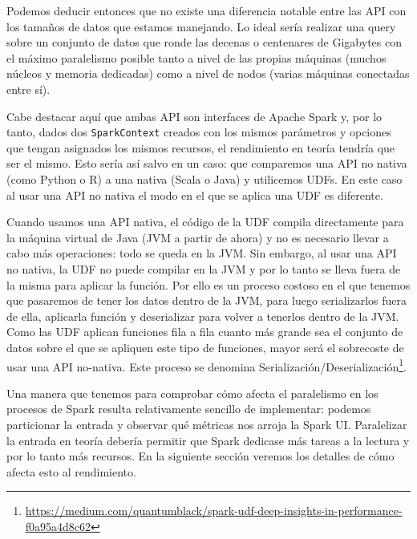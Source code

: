 \documentclass[12pt,twoside,titlepage]{report}
\begin{document}
Podemos deducir entonces que no existe una diferencia notable entre las API con los tamaños de datos que estamos manejando. Lo ideal sería realizar una query sobre un conjunto de datos que ronde las decenas o centenares de Gigabytes con el máximo paralelismo posible tanto a nivel de las propias máquinas (muchos núcleos y memoria dedicadas) como a nivel de nodos (varias máquinas conectadas entre sí).

Cabe destacar aquí que ambas API son interfaces de Apache Spark y, por lo tanto, dados dos \texttt{SparkContext} creados con los mismos parámetros y opciones que tengan asignados los mismos recursos, el rendimiento en teoría tendría que ser el mismo. Esto sería así salvo en un caso: que comparemos una API no nativa (como Python o R) a una nativa (Scala o Java) y utilicemos UDFs. En este caso al usar una API no nativa el modo en el que se aplica una UDF es diferente.




Cuando usamos una API nativa, el código de la UDF compila directamente para la máquina virtual de Java (JVM a partir de ahora) y no es necesario llevar a cabo más operaciones: todo se queda en la JVM. Sin embargo, al usar una API no nativa, la UDF no puede compilar en la JVM y por lo tanto se lleva fuera de la misma para aplicar la función. Por ello es un proceso costoso en el que tenemos que pasaremos de tener los datos dentro de la JVM, para luego serializarlos fuera de ella, aplicarla función y deserializar para volver a tenerlos  dentro de la JVM. Como las UDF aplican funciones fila a fila cuanto más grande sea el conjunto de datos sobre el que se apliquen este tipo de funciones, mayor será el sobrecoste de usar una API no-nativa. Este proceso se denomina Serialización/Deserialización\footnote{\url{https://medium.com/quantumblack/spark-udf-deep-insights-in-performance-f0a95a4d8c62}}.

Una manera que tenemos para comprobar cómo afecta el paralelismo en los procesos de Spark resulta relativamente sencillo de implementar: podemos particionar la entrada y observar qué métricas nos arroja la Spark UI. Paralelizar la entrada en teoría debería permitir que Spark dedicase más tareas a la lectura y por lo tanto más recursos. En la siguiente sección veremos los detalles de cómo afecta esto al rendimiento.
\end{document}
